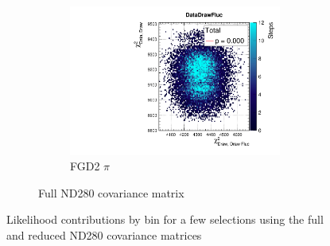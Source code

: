 \begin{figure}[h]
\begin{subfigure}[t]{\textwidth}
\begin{subfigure}[t]{0.32\textwidth}
	\includegraphics[width=\textwidth, trim={20mm 6mm 4mm 11mm}, clip,page=88]{figures/mach3/2018/data/2018a_FixedCov_FullCov_Mpi_Data_merge_PostPredStore_SampLLH_procs}
	\caption*{FGD2 $\pi$}
\end{subfigure}
\caption{Full ND280 covariance matrix}
\end{subfigure}
\caption{Likelihood contributions by \pmu \cosmu bin for a few selections using the full and reduced ND280 covariance matrices}
\label{fig:llh_dist_fullred_2018}
\end{figure}

